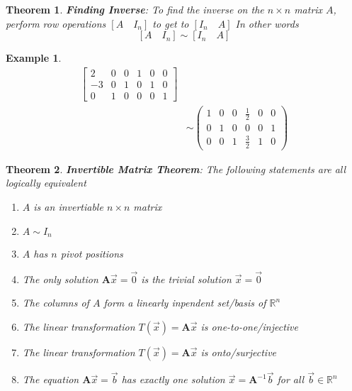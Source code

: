 \documentclass[11pt]{article}
\newtheorem{thm}{Theorem}
\newtheorem{ex}{Example}
\begin{document}
\begin{thm}
  \textbf{Finding Inverse}: To find the inverse on the $n\times n$ matrix $A$, perform row operations $[A \quad I_{n}]$
  to get to $[I_{n} \quad A]$
  In other words
  \[[A \quad I_{n}] \sim [I_{n} \quad A]\]
\end{thm}

\begin{ex}

  \begin{align*}
    \begin{bmatrix} 2 & 0 & 0 & 1 & 0 & 0 \\ -3 & 0 & 1 & 0 & 1 & 0 \\ 0 & 1  & 0 & 0 & 0 & 1 \end{bmatrix} \\
    &\sim
\left(\begin{array}{rrrrrr}
1 & 0 & 0 & \frac{1}{2} & 0 & 0 \\
0 & 1 & 0 & 0 & 0 & 1 \\
0 & 0 & 1 & \frac{3}{2} & 1 & 0
\end{array}\right)
  \end{align*}
\end{ex}



\begin{thm}
  \textbf{Invertible Matrix Theorem}:
  The following statements are all logically equivalent
  \begin{enumerate}
    \item $A$ is an invertiable $n \times n$ matrix
    \item $A \sim I_{n}$
    \item $A$ has $n$ pivot positions
    \item The only solution $\mathbf{A}\vec{x} = \vec{0}$ is the trivial solution $\vec{x} = \vec{0}$
    \item The columns of $A$ form a linearly inpendent set/basis of $\mathbb{R}^{n}$
    \item The linear transformation $T(\vec{x}) = \mathbf{A}\vec{x}$ is one-to-one/injective
    \item The linear transformation $T(\vec{x}) = \mathbf{A}\vec{x}$ is onto/surjective
    \item The equation $\mathbf{A}\vec{x} = \vec{b}$ has exactly one solution $\vec{x} = \mathbf{A}^{-1}\vec{b}$ for all $\vec{b}\in \mathbb{R}^{n}$

  \end{enumerate}
\end{thm}
\end{document}
